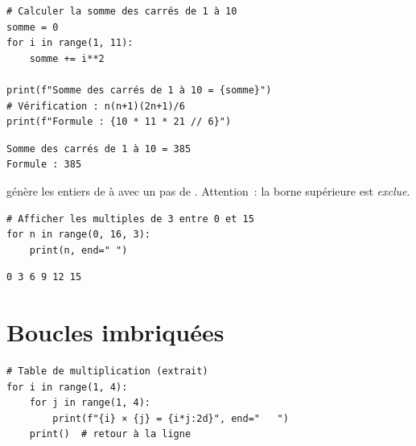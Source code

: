 \begin{codeblock}[title=\textbf{Python}]
\begin{verbatim}
# Calculer la somme des carrés de 1 à 10
somme = 0
for i in range(1, 11):
    somme += i**2

print(f"Somme des carrés de 1 à 10 = {somme}")
# Vérification : n(n+1)(2n+1)/6
print(f"Formule : {10 * 11 * 21 // 6}")
\end{verbatim}
\end{codeblock}

\begin{codeoutput}
\begin{verbatim}
Somme des carrés de 1 à 10 = 385
Formule : 385
\end{verbatim}
\end{codeoutput}

\begin{definition}
 g\'en\`ere les entiers de  \`a  avec un pas de .
Attention~: la borne sup\'erieure  est \emph{exclue}.
\end{definition}

\begin{codeblock}[title=\textbf{Python}]
\begin{verbatim}
# Afficher les multiples de 3 entre 0 et 15
for n in range(0, 16, 3):
    print(n, end=" ")
\end{verbatim}
\end{codeblock}

\begin{codeoutput}
\begin{verbatim}
0 3 6 9 12 15
\end{verbatim}
\end{codeoutput}

\section{Boucles imbriqu\'ees}

\begin{codeblock}[title=\textbf{Python}]
\begin{verbatim}
# Table de multiplication (extrait)
for i in range(1, 4):
    for j in range(1, 4):
        print(f"{i} × {j} = {i*j:2d}", end="   ")
    print()  # retour à la ligne
\end{verbatim}
\end{codeblock}

